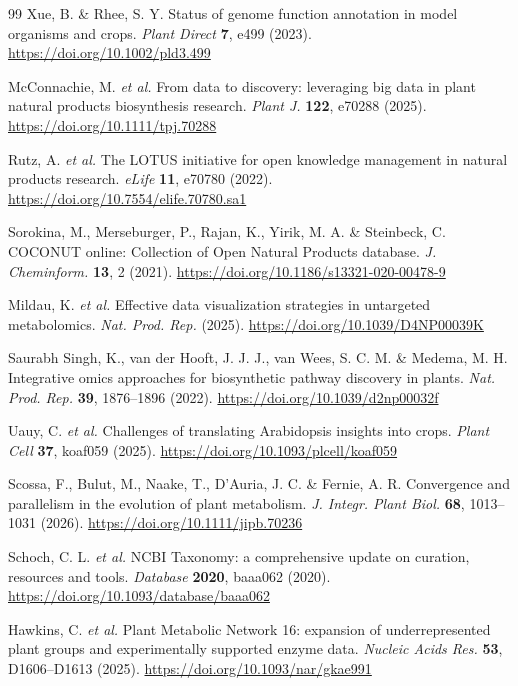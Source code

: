 \documentclass[11pt,a4paper]{article}
\begin{document}
\begin{thebibliography}{99}
Xue, B. \& Rhee, S. Y. Status of genome function annotation in model organisms and crops. \textit{Plant Direct} \textbf{7}, e499 (2023). \url{https://doi.org/10.1002/pld3.499}

McConnachie, M. \textit{et al.} From data to discovery: leveraging big data in plant natural products biosynthesis research. \textit{Plant J.} \textbf{122}, e70288 (2025). \url{https://doi.org/10.1111/tpj.70288}

Rutz, A. \textit{et al.} The LOTUS initiative for open knowledge management in natural products research. \textit{eLife} \textbf{11}, e70780 (2022). \url{https://doi.org/10.7554/elife.70780.sa1}

Sorokina, M., Merseburger, P., Rajan, K., Yirik, M. A. \& Steinbeck, C. COCONUT online: Collection of Open Natural Products database. \textit{J. Cheminform.} \textbf{13}, 2 (2021). \url{https://doi.org/10.1186/s13321-020-00478-9}

Mildau, K. \textit{et al.} Effective data visualization strategies in untargeted metabolomics. \textit{Nat. Prod. Rep.} (2025). \url{https://doi.org/10.1039/D4NP00039K}

Saurabh Singh, K., van der Hooft, J. J. J., van Wees, S. C. M. \& Medema, M. H. Integrative omics approaches for biosynthetic pathway discovery in plants. \textit{Nat. Prod. Rep.} \textbf{39}, 1876--1896 (2022). \url{https://doi.org/10.1039/d2np00032f}

Uauy, C. \textit{et al.} Challenges of translating Arabidopsis insights into crops. \textit{Plant Cell} \textbf{37}, koaf059 (2025). \url{https://doi.org/10.1093/plcell/koaf059}

Scossa, F., Bulut, M., Naake, T., D'Auria, J. C. \& Fernie, A. R. Convergence and parallelism in the evolution of plant metabolism. \textit{J. Integr. Plant Biol.} \textbf{68}, 1013--1031 (2026). \url{https://doi.org/10.1111/jipb.70236}

Schoch, C. L. \textit{et al.} NCBI Taxonomy: a comprehensive update on curation, resources and tools. \textit{Database} \textbf{2020}, baaa062 (2020). \url{https://doi.org/10.1093/database/baaa062}

Hawkins, C. \textit{et al.} Plant Metabolic Network 16: expansion of underrepresented plant groups and experimentally supported enzyme data. \textit{Nucleic Acids Res.} \textbf{53}, D1606--D1613 (2025). \url{https://doi.org/10.1093/nar/gkae991}


\end{thebibliography}
\end{document}
